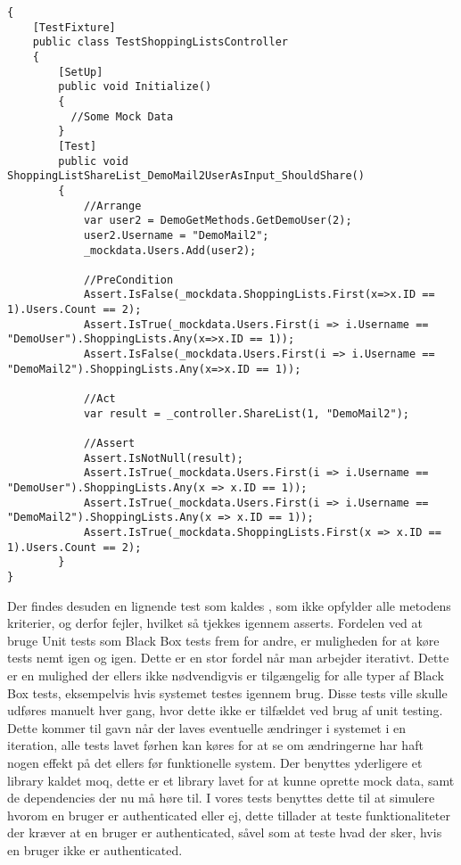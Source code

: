 \begin{lstlisting}[caption={Test for metoden \class{ShareList}.}, label=lsttest]
{
    [TestFixture]
    public class TestShoppingListsController
    {
    	[SetUp]
        public void Initialize()
        {
          //Some Mock Data
        }
        [Test]
        public void ShoppingListShareList_DemoMail2UserAsInput_ShouldShare()
        {
            //Arrange
            var user2 = DemoGetMethods.GetDemoUser(2);
            user2.Username = "DemoMail2";
            _mockdata.Users.Add(user2); 

            //PreCondition
            Assert.IsFalse(_mockdata.ShoppingLists.First(x=>x.ID == 1).Users.Count == 2);
            Assert.IsTrue(_mockdata.Users.First(i => i.Username == "DemoUser").ShoppingLists.Any(x=>x.ID == 1));
            Assert.IsFalse(_mockdata.Users.First(i => i.Username == "DemoMail2").ShoppingLists.Any(x=>x.ID == 1));

            //Act
            var result = _controller.ShareList(1, "DemoMail2");

            //Assert
            Assert.IsNotNull(result);
            Assert.IsTrue(_mockdata.Users.First(i => i.Username == "DemoUser").ShoppingLists.Any(x => x.ID == 1));
            Assert.IsTrue(_mockdata.Users.First(i => i.Username == "DemoMail2").ShoppingLists.Any(x => x.ID == 1));
            Assert.IsTrue(_mockdata.ShoppingLists.First(x => x.ID == 1).Users.Count == 2);
        }
}        
\end{lstlisting}
Der findes desuden en lignende test som kaldes , som ikke opfylder alle metodens kriterier, og derfor fejler, hvilket så tjekkes igennem asserts.
Fordelen ved at bruge Unit tests som Black Box tests frem for andre, er muligheden for at køre tests nemt igen og igen.
Dette er en stor fordel når man arbejder iterativt.
Dette er en mulighed der ellers ikke nødvendigvis er tilgængelig for alle typer af Black Box tests, eksempelvis hvis systemet testes igennem brug.
Disse tests ville skulle udføres manuelt hver gang, hvor dette ikke er tilfældet ved brug af unit testing.
Dette kommer til gavn når der laves eventuelle ændringer i systemet i en iteration, alle tests lavet førhen kan køres for at se om ændringerne har haft nogen effekt på det ellers før funktionelle system. 
Der benyttes yderligere et library kaldet moq, dette er et library lavet for at kunne oprette mock data, samt de dependencies der nu må høre til.
I vores tests benyttes dette til at simulere hvorom en bruger er authenticated eller ej, dette tillader at teste funktionaliteter der kræver at en bruger er authenticated, såvel som at teste hvad der sker, hvis en bruger ikke er authenticated.

